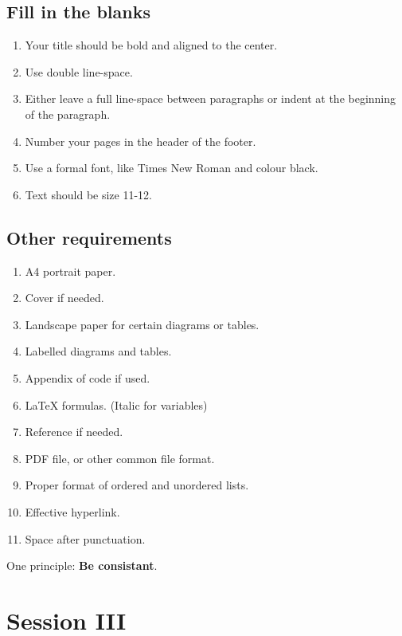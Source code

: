 \documentclass[a4paper]{article}
\begin{document}
\subsection{Fill in the blanks}

\begin{enumerate}
    \item Your title should be bold and aligned to the center.
    \item Use double line-space.
    \item Either leave a full line-space between paragraphs or indent at the beginning of the paragraph.
    \item Number your pages in the header of the footer.
    \item Use a formal font, like Times New Roman and colour black.
    \item Text should be size 11-12.
\end{enumerate}

\subsection{Other requirements}

\begin{enumerate}
    \item A4 portrait paper.
    \item Cover if needed.
    \item Landscape paper for certain diagrams or tables.
    \item Labelled diagrams and tables.
    \item Appendix of code if used.
    \item LaTeX formulas. (Italic for variables)
    \item Reference if needed.
    \item PDF file, or other common file format.
    \item Proper format of ordered and unordered lists.
    \item Effective hyperlink.
    \item Space after punctuation.
\end{enumerate}

One principle: \textbf{Be consistant}.

\section{Session III}

\end{document}
